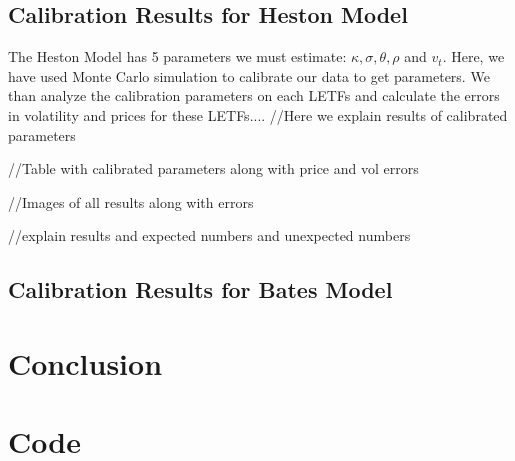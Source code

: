 \documentclass{article}
\begin{document}
\subsection{Calibration Results for Heston Model}
The Heston Model has 5 parameters we must estimate: $\kappa, \sigma, \theta, \rho$ and $v_t$. Here, we have used Monte Carlo simulation to calibrate our data to get parameters. We than analyze the calibration parameters on each LETFs and calculate the errors in volatility and prices for these LETFs....
//Here we explain results of calibrated parameters

//Table with calibrated parameters along with price and vol errors

//Images of all results along with errors

//explain results and expected numbers and unexpected numbers

\subsection{Calibration Results for Bates Model}
\section{Conclusion}
\section{Code}




\citep{ref1}
\citep{ref2}
\citep{ref3}
\citep{ref4}
\end{document}

